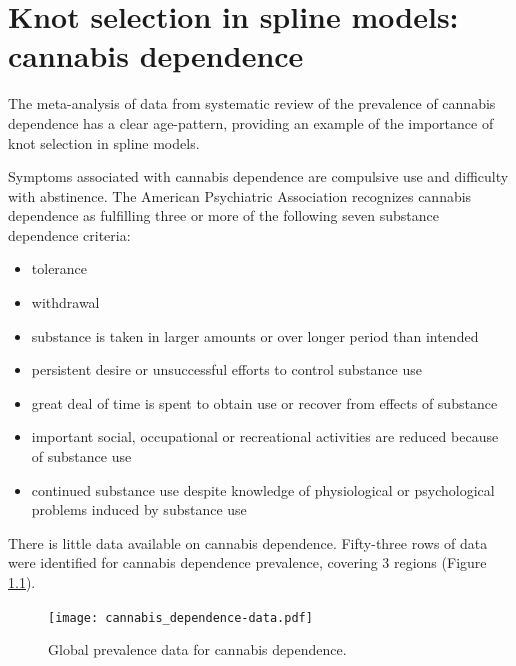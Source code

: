\chapter{Knot selection in spline models: cannabis dependence}
\label{applications-splines_knot_loc}

The meta-analysis of data from systematic review of the prevalence of
cannabis dependence has a clear age-pattern, providing an example of
the importance of knot selection in spline models.

Symptoms associated with cannabis dependence are compulsive use and
difficulty with abstinence.  The American Psychiatric Association
recognizes cannabis dependence as fulfilling three or more of the
following seven substance dependence criteria:
    \begin{itemize} \label{page:app-substance_dependence}
        \item tolerance
        \item withdrawal
        \item substance is taken in larger amounts or over longer
          period than intended
        \item persistent desire or unsuccessful efforts to control
          substance use
        \item great deal of time is spent to obtain use or recover
          from effects of substance
        \item important social, occupational or recreational
          activities are reduced because of substance use
        \item continued substance use despite knowledge of
          physiological or psychological problems induced by substance
          use \cite{american_diagnostic_2000, coffey_cannabis_2002}
    \end{itemize}

There is little data available on cannabis dependence.  Fifty-three
rows of data were identified for cannabis dependence prevalence,
covering 3 regions (Figure \ref{fig:app-cannabis_data}).

    \begin{figure}[h]
        \begin{center}
            \texttt{[image: cannabis\_dependence-data.pdf]}
            \caption{Global prevalence data for cannabis dependence.}
            \label{fig:app-cannabis_data}
        \end{center}
    \end{figure}

